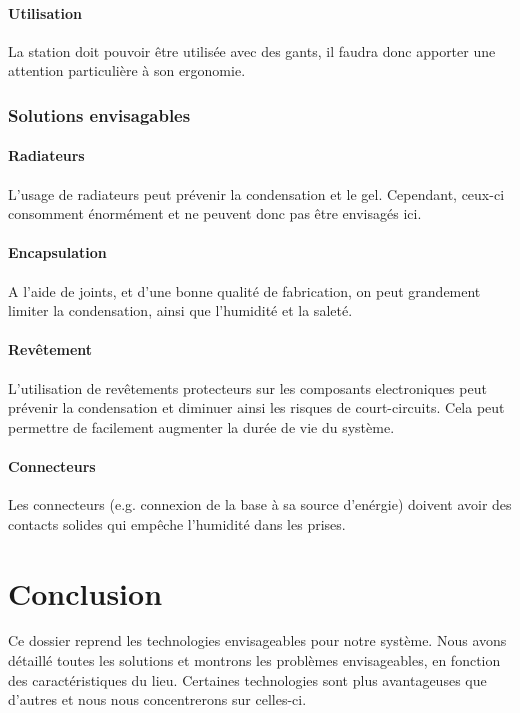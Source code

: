 
\paragraph{Utilisation}

La station doit pouvoir être utilisée avec des gants, il faudra donc apporter une attention particulière à son ergonomie.

\subsubsection{Solutions envisagables}

\paragraph{Radiateurs}

L'usage de radiateurs peut prévenir la condensation et le gel. Cependant, ceux-ci consomment énormément et ne peuvent donc pas être envisagés ici.

\paragraph{Encapsulation}

A l'aide de joints, et d'une bonne qualité de fabrication, on peut grandement limiter la condensation, ainsi que l'humidité et la saleté.

\paragraph{Revêtement}

L'utilisation de revêtements protecteurs sur les composants electroniques peut prévenir la condensation et diminuer ainsi les risques de court-circuits. Cela peut permettre de facilement augmenter la durée de vie du système.

\paragraph{Connecteurs}

Les connecteurs (e.g. connexion de la base à sa source d'enérgie) doivent avoir des contacts solides qui empêche l’humidité dans les prises.

\section{Conclusion}

Ce dossier reprend les technologies envisageables pour notre système. Nous avons détaillé toutes les solutions et montrons les problèmes envisageables, en fonction des caractéristiques du lieu. Certaines technologies sont plus avantageuses que d'autres et nous nous concentrerons sur celles-ci.